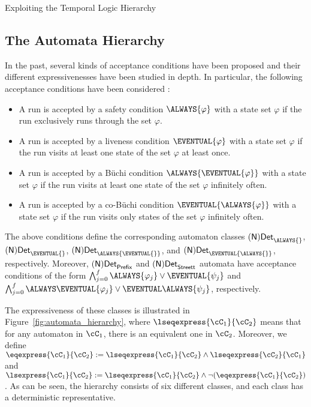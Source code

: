 \documentclass[copyright,creativecommons]{eptcs}
\begin{document}
\begin{section}{Exploiting the Temporal Logic Hierarchy}
\label{TemporalLogicHierarchySec}

\subsection{The Automata Hierarchy}
\label{AutomataHierarchySec}
In the past, several kinds of acceptance conditions have been proposed and their different expressivenesses have been studied in depth. In particular, the following acceptance conditions have been considered \cite{Wagn79,Thom90a,Schn03}:

\begin{itemize}
\item A run is accepted by a safety condition $\ALWAYS{\varphi}$ with a state
set $\varphi$ if the run exclusively runs through the set $\varphi$.
\item A run is accepted by a liveness condition $\EVENTUAL{\varphi}$ with
a state set $\varphi$ if the run visits at least one state of the set $\varphi$ at least once.
\item A run is accepted by a Büchi condition $\ALWAYS{\EVENTUAL{\varphi}}$ with
a state set $\varphi$ if the run visits at least one state of the set $\varphi$
infinitely often.
\item A run is accepted by a co-Büchi condition $\EVENTUAL{\ALWAYS{\varphi}}$
with a state set $\varphi$ if the run visits only states of the set $\varphi$
infinitely often.
\end{itemize}

\noindent The above conditions define the corresponding automaton classes ${\sf (N)Det}_{\ALWAYS{}}$, ${\sf (N)Det}_{\EVENTUAL{}}$, ${\sf (N)Det}_{\ALWAYS{\EVENTUAL{}}}$, and ${\sf (N)Det}_{\EVENTUAL{\ALWAYS{}}}$, respectively. Moreover, ${\sf (N)Det}_{\sf Prefix}$ and ${\sf (N)Det}_{\sf Streett}$ automata have acceptance conditions of the form $\bigwedge_{j=0}^{f} \ALWAYS{\varphi_j} \vee \EVENTUAL{\psi_j}$ and $\bigwedge_{j=0}^{f}\ALWAYS\EVENTUAL{\varphi_j}\vee \EVENTUAL\ALWAYS{\psi_j}$, respectively.

The expressiveness of these classes is illustrated in Figure~\ref{fig:automata_hierarchy}, where $\lseqexpress{\cC_1}{\cC_2}$ means that for any automaton in $\cC_1$, there is an equivalent one in $\cC_2$. Moreover, we define $\eqexpress{\cC_1}{\cC_2} := \lseqexpress{\cC_1}{\cC_2} \wedge \lseqexpress{\cC_2}{\cC_1}$ and $\lsexpress{\cC_1}{\cC_2} := \lseqexpress{\cC_1}{\cC_2} \wedge \neg (\eqexpress{\cC_1}{\cC_2})$. As can be seen, the hierarchy consists of six different classes, and each class has a deterministic representative.


\end{section}
\end{document}

